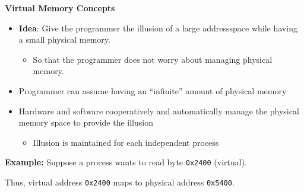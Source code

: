 \documentclass[11pt, table, aspectratio=169]{beamer}
\begin{document}
		\begin{frame}[fragile]{\textbf{Virtual Memory Concepts}}
\begin{itemize}
			\item \textbf{Idea}: Give the programmer the illusion of a large addressspace while having a small physical memory. 
			\begin{itemize}
				\item So that the programmer does not worry about managing physical memory.
			\end{itemize}
			
			\item Programmer can assume having an ``infinite'' amount of physical memory
			
			
			\item Hardware and software cooperatively and automatically manage the physical memory space to provide the illusion
			 
			 \begin{itemize}
			 	\item Illusion is maintained for each independent process
			 \end{itemize}
		
		\end{itemize}
			 
			\textbf{Example:} Suppose a process wants to read byte \texttt{0x2400} (virtual).		
			\vspace{-0.4cm}
			\begin{center}
			\end{center}
			Thus, virtual address \texttt{0x2400} maps to physical address \texttt{0x5400}.
			
		\end{frame}
		
\end{document}
